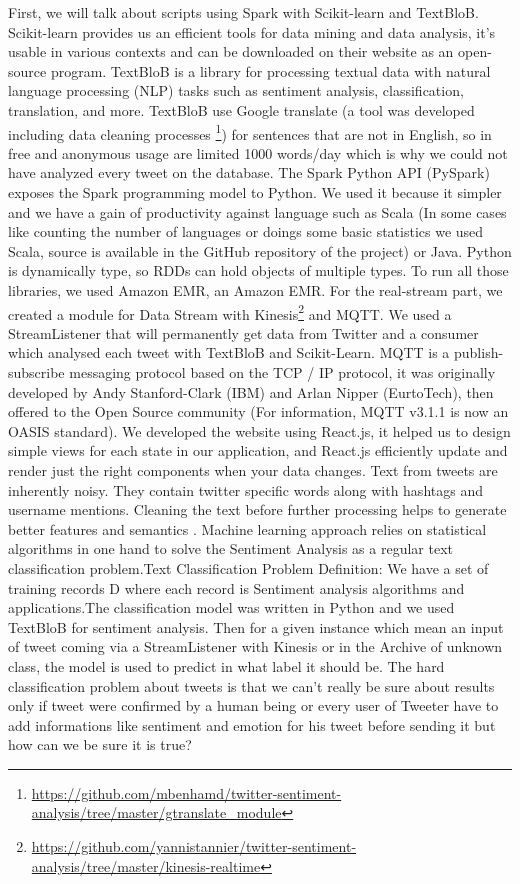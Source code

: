 \documentclass{acmtog} %
\begin{document}
First, we will talk about scripts using Spark with Scikit-learn and TextBloB. Scikit-learn provides us an efficient tools for data mining and data analysis, it’s usable in various contexts and can be downloaded on their website as an open-source program. TextBloB is a library for processing textual data with natural language processing (NLP) \cite{Saif12} tasks such as sentiment analysis, classification, translation, and more. TextBloB use Google translate (a tool was developed including data cleaning processes \footnote{\url{https://github.com/mbenhamd/twitter-sentiment-analysis/tree/master/gtranslate_module}}) for sentences that are not in English, so in free and anonymous usage are limited 1000 words/day which is why we could not have analyzed every tweet on the database. The Spark Python API (PySpark) exposes the Spark programming model to Python. We used it because it simpler and we have a gain of productivity against language such as Scala (In some cases like counting the number of languages or doings some basic statistics we used Scala, source is available in the GitHub repository of the project) or Java. Python is dynamically type, so RDDs can hold objects of multiple types. To run all those libraries, we used Amazon EMR, an Amazon EMR. For the real-stream part, we created a module for Data Stream with Kinesis\footnote{\url{https://github.com/yannistannier/twitter-sentiment-analysis/tree/master/kinesis-realtime}} and MQTT. We used a StreamListener that will permanently get data from Twitter and a consumer which analysed each tweet with TextBloB and Scikit-Learn.
MQTT is a publish-subscribe messaging protocol based on the TCP / IP protocol, it was originally developed by Andy Stanford-Clark (IBM) and Arlan Nipper (EurtoTech), then offered to the Open Source community (For information, MQTT v3.1.1 is now an OASIS standard). We developed the website using React.js, it helped us to design simple views for each state in our application, and React.js efficiently update and render just the right components when your data changes. Text from tweets are inherently noisy. They contain twitter specific words along with hashtags and username mentions. Cleaning the text before further processing helps to generate better features and semantics \cite{Saif12}.
Machine learning approach relies on statistical algorithms in one hand to solve the Sentiment Analysis as a regular text classification problem.Text Classification Problem Definition: We have a set of training records D where each record is Sentiment analysis algorithms and applications.The classification model was written in Python and we used TextBloB for sentiment analysis. Then for a given instance which mean an input of tweet coming via a StreamListener with Kinesis or in the Archive of unknown class, the model is used to predict in what label it should be. The hard classification problem about tweets is that we can't really be sure about results only if tweet were confirmed by a human being or every user of Tweeter have to add informations like sentiment and emotion for his tweet before sending it but how can we be sure it is true?
\end{document}
